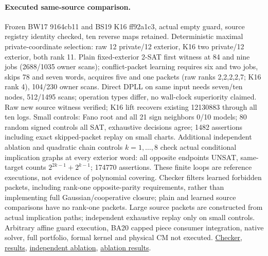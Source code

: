 \documentclass[11pt]{article}
\begin{document}
\paragraph{Executed same-source comparison.}
Frozen BW17 9164cb11 and BS19 K16 ff92a1c3, actual empty guard, source registry identity checked, ten reverse maps retained. Deterministic maximal private-coordinate selection: raw 12 private/12 exterior, K16 two private/12 exterior, both rank 11. Plain fixed-exterior 2-SAT first witness at 84 and nine jobs (2688/1035 owner scans); conflict-packet learning requires six and two jobs, skips 78 and seven words, acquires five and one packets (raw ranks 2,2,2,2,7; K16 rank 4), 104/230 owner scans. Direct DPLL on same input needs seven/ten nodes, 512/1495 scans; operation types differ, no wall-clock superiority claimed. Raw new source witness verified; K16 lift recovers existing 12130883 through all ten logs. Small controls: Fano root and all 21 sign neighbors 0/10 models; 80 random signed controls all SAT, exhaustive decisions agree; 1482 assertions including exact skipped-packet replay on small charts. Additional independent ablation and quadratic chain controls $k=1,\ldots,8$ check actual conditional implication graphs at every exterior word: all opposite endpoints UNSAT, same-target counts $2^{2k-1}+2^{k-1}$; 174770 assertions. These finite loops are reference executions, not evidence of polynomial covering. Checker filters learned forbidden packets, including rank-one opposite-parity requirements, rather than implementing full Gaussian/cooperative closure; plain and learned source comparisons have no rank-one packets. Large source packets are constructed from actual implication paths; independent exhaustive replay only on small controls. Arbitrary affine guard execution, BA20 capped piece consumer integration, native solver, full portfolio, formal kernel and physical CM not executed. \href{https://github.com/j15marti/pnp/commit/2aef1aa6d484e5761b4b38b5a01371800552c616}{Checker}, \href{https://github.com/j15marti/pnp/commit/c736065bdc4742f72b2dd342bc6ba82c70eda701}{results}, \href{https://github.com/j15marti/pnp/commit/186583ded9b1264a3407eda25b633fc6c6138362}{independent ablation}, \href{https://github.com/j15marti/pnp/commit/1a732c088113361df9d1ce5bbdb16ba5f1a221eb}{ablation results}.
\end{document}

